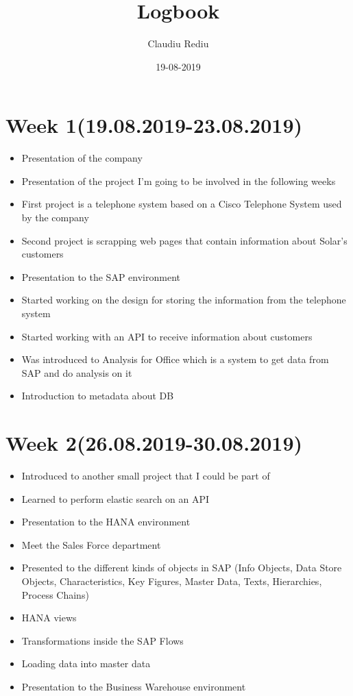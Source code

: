 \documentclass{article}
\title{Logbook}
\date{19-08-2019}
\author{Claudiu Rediu}
\begin{document}
	\maketitle
	\newpage
	
	\section{Week 1(19.08.2019-23.08.2019)}
	\begin{itemize}
		\item Presentation of the company
		\item Presentation of the project I'm going to be involved in the following weeks
		\item First project is a telephone system based on a Cisco Telephone System used by the company
		\item Second project is scrapping web pages that contain information about Solar's customers
		\item Presentation to the SAP environment
		\item Started working on the design for storing the information from the telephone system
		\item Started working with an API to receive information about customers
		\item Was introduced to Analysis for Office which is a system to get data from SAP and do analysis on it
		\item Introduction to metadata about DB
	\end{itemize}

	\section{Week 2(26.08.2019-30.08.2019)}
	\begin{itemize}
		\item Introduced to another small project that I could be part of
		\item Learned to perform elastic search on an API
		\item Presentation to the HANA environment
		\item Meet the Sales Force department
		\item Presented to the different kinds of objects in SAP (Info Objects, Data Store Objects, Characteristics, Key Figures, Master Data, Texts, Hierarchies, Process Chains)
		\item HANA views
		\item Transformations inside the SAP Flows
		\item Loading data into master data
		\item Presentation to the Business Warehouse environment
	\end{itemize}
\end{document}
